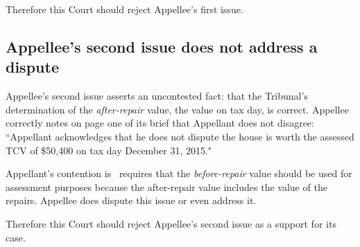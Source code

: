 \documentclass[12pt,\documentclassflag]{michiganCourtOfAppealsBrief}
\begin{document}
Therefore this Court should reject Appellee's first issue.





\subsection{Appellee's second issue does not address a dispute}

Appellee's second issue asserts an uncontested fact: that the Tribunal's determination of the {\em after-repair} value, the value on tax day, is correct. Appellee correctly notes on page one of its brief that Appellant does not disagree: ``Appellant acknowledges that he does not dispute the house is worth the assessed TCV of \$50,400 on tax day December 31, 2015."

Appellant's contention is \mathieuGast\ requires that the {\em before-repair} value should be used for assessment purposes because the after-repair value includes the value of the repairs. Appellee does dispute this issue or even address it.

Therefore this Court should reject Appellee's second issue as a support for its case.



\end{document}
